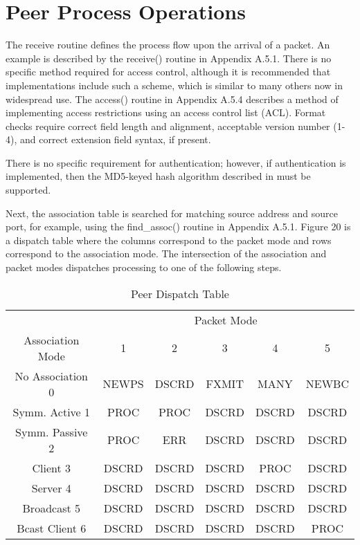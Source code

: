 \section{Peer Process Operations}

The receive routine defines the process flow upon the arrival of a
packet. An example is described by the receive() routine in
Appendix A.5.1. There is no specific method required for access
control, although it is recommended that implementations include such
a scheme, which is similar to many others now in widespread use. The
access() routine in Appendix A.5.4 describes a method of implementing
access restrictions using an access control list (ACL). Format
checks require correct field length and alignment, acceptable version
number (1-4), and correct extension field syntax, if present.

There is no specific requirement for authentication; however, if
authentication is implemented, then the MD5-keyed hash algorithm
described in \cite{RFC1321} must be supported.

Next, the association table is searched for matching source address
and source port, for example, using the find\_assoc() routine in
Appendix A.5.1. Figure 20 is a dispatch table where the columns
correspond to the packet mode and rows correspond to the association
mode. The intersection of the association and packet modes
dispatches processing to one of the following steps.

\begin{table}[htb]
\center
\begin{tabular}{c | c | c | c | c | c}
 & \multicolumn{5}{c}{Packet Mode} \\
Association Mode & 1 & 2 & 3 & 4 & 5 \\
\hline
\hline
No Association 0 & NEWPS & DSCRD & FXMIT & MANY & NEWBC \\
Symm. Active 1 & PROC & PROC & DSCRD & DSCRD & DSCRD \\
Symm. Passive 2 & PROC & ERR & DSCRD & DSCRD & DSCRD \\
Client 3 & DSCRD & DSCRD & DSCRD & PROC & DSCRD \\
Server 4 & DSCRD & DSCRD & DSCRD & DSCRD & DSCRD \\
Broadcast 5 & DSCRD & DSCRD & DSCRD & DSCRD & DSCRD \\
Bcast Client 6 & DSCRD & DSCRD & DSCRD & DSCRD & PROC \\
\hline
\end{tabular}
\label{peer_dispatch_table}
\caption{Peer Dispatch Table}
\end{table}

